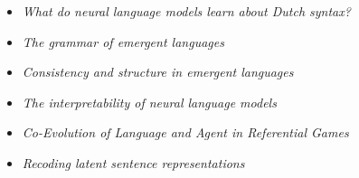 {{{
{\begin{itemize}
  \item[] \textit{What do neural language models learn about Dutch syntax?}
\end{itemize}
}}

{
{\begin{itemize}
  \item[] \textit{The grammar of emergent languages}
\end{itemize}
}}

{
{\begin{itemize}
  \item[] \textit{Consistency and structure in emergent languages}
\end{itemize}
}}


{
{\begin{itemize}
  \item[] \textit{The interpretability of neural language models}
\end{itemize}
}}

{
{\begin{itemize}
  \item[] \textit{Co-Evolution of Language and Agent in Referential Games}
\end{itemize}
}

{
{\begin{itemize}
  \item[] \textit{Recoding latent sentence representations}
\end{itemize}
}

}}}}

